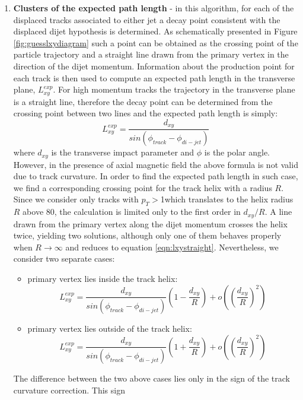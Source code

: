 \begin{enumerate}
\item{\bf Clusters of the expected path length}  
\label{subsec:Clusters}
- in this algorithm, for each of the displaced tracks associated to either jet a decay point consistent 
with the displaced dijet hypothesis 
is determined. As schematically presented in Figure 
\ref{fig:guesslxydiagram} such a point 
 can be obtained as the crossing point of   
the particle trajectory and a straight line drawn from the primary vertex in the direction of the dijet momentum.  
Information about the production point for each track is then used to compute an expected path length in the
transverse plane, $L_{xy}^{exp}$.  
For high momentum tracks the trajectory in the transverse plane is a straight line,
 therefore the decay point can be determined from the crossing point between two lines
 and the expected path length is simply:
\begin{equation}
 L_{xy}^{exp}=\frac{d_{xy}}{sin(\phi_{track} - \phi_{di-jet})}
\label{eqn:lxystraight}
\end{equation}
where $d_{xy}$ is the transverse impact parameter and $\phi$ is the polar angle. However, in the presence of axial magnetic field 
the above formula is not valid due to track curvature. In order to find the expected path length in such case,
 we find a corresponding crossing point for the track helix with a radius $R$. Since we consider only
tracks with $p_T>$1\GeV which translates to the helix radius $R$ above 80\cm, 
the calculation is limited only to the first order in 
$d_{xy}/R$. 
 A line drawn from the primary vertex along the dijet momentum crosses the helix twice, yielding
 two solutions, although only one of them behaves properly when $R \to \infty$ 
and reduces to equation \ref{eqn:lxystraight}. Nevertheless, we consider two  
separate cases:
\begin{itemize}
 \item primary vertex lies inside the track helix:
\begin{equation}
 L_{xy}^{exp} = \frac{d_{xy}}{sin(\phi_{track} - \phi_{di-jet})} (1 - \frac{d_{xy}}{R}) + o((\frac{d_{xy}}{R})^2)
\end{equation} 
 \item primary vertex lies outside of the track helix:
\begin{equation}
 L_{xy}^{exp} = \frac{d_{xy}}{sin(\phi_{track} - \phi_{di-jet})} (1 + \frac{d_{xy}}{R}) + o((\frac{d_{xy}}{R})^2)
\end{equation} 
\end{itemize}
The difference between the two above cases lies only in the sign of the track curvature correction. This sign

\end{enumerate}
